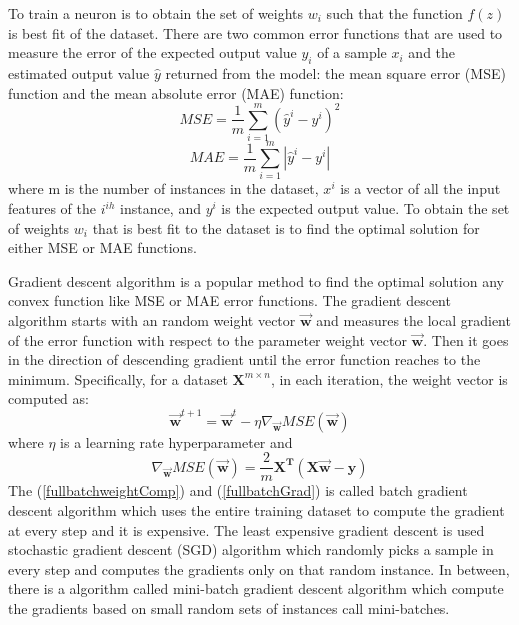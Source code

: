 \documentclass{article}
\begin{document}
To train a neuron is to obtain the set of weights $w_i$ such that the function $f(z)$ is best fit of the dataset. There are two common error functions that are used to measure the error of the expected output value $y_i$ of a sample $x_i$ and the estimated output value $\hat{y}$ returned from the model: the mean square error (MSE) function and the mean absolute error (MAE) function:
\begin{equation}
MSE = \frac{1}{m}\sum_{i=1}^{m}(\hat{y}^i - y^i)^2 
\end{equation}
\begin{equation}
MAE = \frac{1}{m}\sum_{i=1}^{m}|\hat{y}^i - y^i|
\end{equation}
where m is the number of instances in the dataset, $x^i$ is a vector of all the input features of the $i^{ih}$ instance, and $y^i$ is the expected output value. To obtain the set of weights $w_i$ that is best fit to the dataset is to find the optimal solution for either MSE or MAE functions. 

Gradient descent algorithm is a popular method to find the optimal solution any convex function like MSE or MAE error functions. The gradient descent algorithm starts with an random weight vector $\vec{\mathbf{w}}$ and measures the local gradient of the error function with respect to the parameter weight vector $\vec{\mathbf{w}}$. Then it goes in the direction of descending gradient until the error function reaches to the minimum. Specifically, for a dataset $\mathbf{X}^{m \times n}$, in each iteration, the weight vector is computed as:
\begin{equation} \label{fullbatchweightComp}
\mathbf{\vec{w}}^{t+1} = \mathbf{\vec{w}}^t - \eta\nabla_{\mathbf{\vec{w}}}MSE(\mathbf{\vec{w}}) 
\end{equation}
where $\eta$ is a learning rate hyperparameter and
\begin{equation} \label{fullbatchGrad}
\nabla_{\mathbf{\vec{w}}}MSE(\mathbf{\vec{w}})= \frac{2}{m}\mathbf{X^T}(\mathbf{X}\vec{\mathbf{w}} - \mathbf{y})
\end{equation}
The (\ref{fullbatchweightComp}) and (\ref{fullbatchGrad}) is called batch gradient descent algorithm which uses the entire training dataset to compute the gradient at every step and it is expensive. The least expensive gradient descent is used stochastic gradient descent (SGD) algorithm which randomly picks a sample in every step and computes the gradients only on that random instance. In between, there is a algorithm called mini-batch gradient descent algorithm which compute the gradients based on small random sets of instances call mini-batches. 
\end{document}

